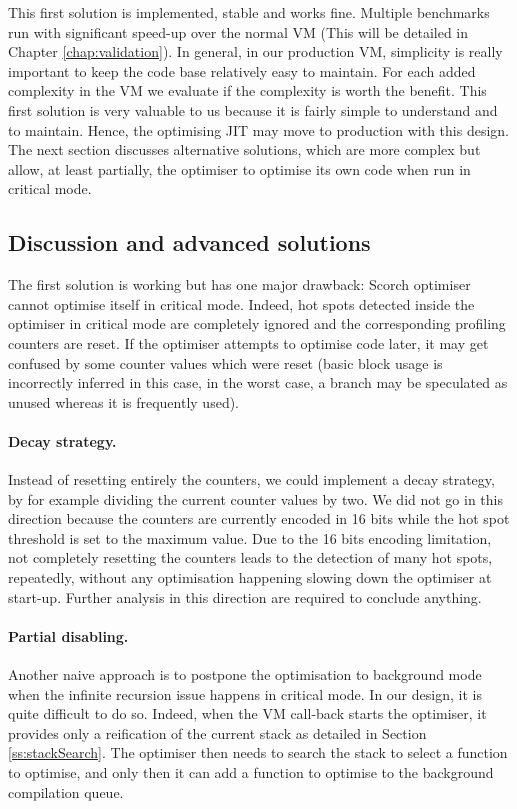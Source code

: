 \documentclass[a4paper,12pt,twoside]{../includes/ThesisStyle}
\begin{document}
This first solution is implemented, stable and works fine. Multiple benchmarks run with significant speed-up over the normal VM (This will be detailed in Chapter \ref{chap:validation}). In general, in our production VM, simplicity is really important to keep the code base relatively easy to maintain. For each added complexity in the VM we evaluate if the complexity is worth the benefit. This first solution is very valuable to us because it is fairly simple to understand and to maintain. Hence, the optimising JIT may move to production with this design. The next section discusses alternative solutions, which are more complex but allow, at least partially, the optimiser to optimise its own code when run in critical mode.

\subsection{Discussion and advanced solutions}

The first solution is working but has one major drawback: Scorch optimiser cannot optimise itself in critical mode. Indeed, hot spots detected inside the optimiser in critical mode are completely ignored and the corresponding profiling counters are reset. If the optimiser attempts to optimise code later, it may get confused by some counter values which were reset (basic block usage is incorrectly inferred in this case, in the worst case, a branch may be speculated as unused whereas it is frequently used). 

\paragraph{Decay strategy.} Instead of resetting entirely the counters, we could implement a decay strategy, by for example dividing the current counter values by two. We did not go in this direction because the counters are currently encoded in 16 bits while the hot spot threshold is set to the maximum value. Due to the 16 bits encoding limitation, not completely resetting the counters leads to the detection of many hot spots, repeatedly, without any optimisation happening slowing down the optimiser at start-up. Further analysis in this direction are required to conclude anything.

\paragraph{Partial disabling.} \label{par:PartialDisabing} Another naive approach is to postpone the optimisation to background mode when the infinite recursion issue happens in critical mode. In our design, it is quite difficult to do so. Indeed, when the VM call-back starts the optimiser, it provides only a reification of the current stack as detailed in Section \ref{ss:stackSearch}. The optimiser then needs to search the stack to select a function to optimise, and only then it can add a function to optimise to the background compilation queue. 
\end{document}
